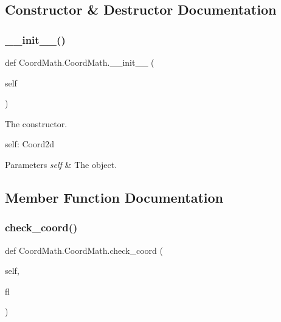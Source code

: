 \subsection{Constructor \& Destructor Documentation}
\mbox{\label{classCoordMath_1_1CoordMath_a8667d55c1b0fa08f62506ff7fab886da}} 
\subsubsection{\texorpdfstring{\+\_\+\+\_\+init\+\_\+\+\_\+()}{\_\_init\_\_()}}
{\footnotesize\ttfamily def Coord\+Math.\+Coord\+Math.\+\_\+\+\_\+init\+\_\+\+\_\+ (\begin{DoxyParamCaption}\item[{}]{self }\end{DoxyParamCaption})}



The constructor. 

self\+: Coord2d 
\begin{DoxyParams}{Parameters}
{\em self} & The object. \\
\hline
\end{DoxyParams}


\subsection{Member Function Documentation}
\mbox{\label{classCoordMath_1_1CoordMath_a3d580c26997a545b92b672ccd8497a07}} 
\subsubsection{\texorpdfstring{check\+\_\+coord()}{check\_coord()}}
{\footnotesize\ttfamily def Coord\+Math.\+Coord\+Math.\+check\+\_\+coord (\begin{DoxyParamCaption}\item[{}]{self,  }\item[{}]{fl }\end{DoxyParamCaption})}




